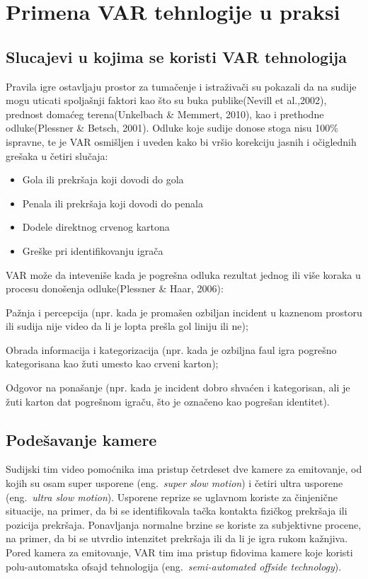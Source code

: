 \documentclass[a4paper]{article}
\begin{document}
\section{Primena VAR tehnlogije u praksi}
\subsection{Slucajevi u kojima se koristi VAR tehnologija}
Pravila igre ostavljaju prostor za tumačenje i istraživači su pokazali da na sudije mogu uticati spoljašnji faktori kao što su buka publike(Nevill et al.,2002), prednost domaćeg terena(Unkelbach \& Memmert, 2010), kao i prethodne odluke(Plessner \& Betsch, 2001). Odluke koje sudije donose stoga nisu 100\% ispravne, te je VAR osmišljen i uveden kako bi vršio korekciju jasnih i očiglednih grešaka u četiri slučaja:
\begin{itemize}
\item Gola ili prekršaja koji dovodi do gola
\item Penala ili prekršaja koji dovodi do penala
\item Dodele direktnog crvenog kartona
\item Greške pri identifikovanju igrača
\end{itemize}

VAR može da inteveniše kada je pogrešna odluka rezultat jednog ili više koraka u procesu donošenja odluke(Plessner \& Haar, 2006):

Pažnja i percepcija (npr. kada je promašen ozbiljan incident u kaznenom prostoru ili sudija nije video da li je lopta prešla gol liniju ili ne);

Obrada informacija i kategorizacija (npr. kada je ozbiljna faul igra pogrešno kategorisana kao žuti umesto kao crveni karton);

Odgovor na ponašanje (npr. kada je incident dobro shvaćen i kategorisan, ali je žuti karton dat pogrešnom igraču, što je označeno kao pogrešan identitet).
\subsection{Podešavanje kamere}
Sudijski tim video pomoćnika ima pristup četrdeset dve kamere za emitovanje, od kojih su osam super usporene (eng.~{\em super slow motion}) i četiri ultra usporene (eng.~{\em ultra slow motion}). Usporene reprize se uglavnom koriste za činjenične situacije, na primer, da bi se identifikovala tačka kontakta fizičkog prekršaja ili pozicija prekršaja. Ponavljanja normalne brzine se koriste za subjektivne procene, na primer, da bi se utvrdio intenzitet prekršaja ili da li je igra rukom kažnjiva. Pored kamera za emitovanje, VAR tim ima pristup fidovima kamere koje koristi polu-automatska ofsajd tehnologija (eng.~{\em semi-automated offside technology}).
\end{document}
